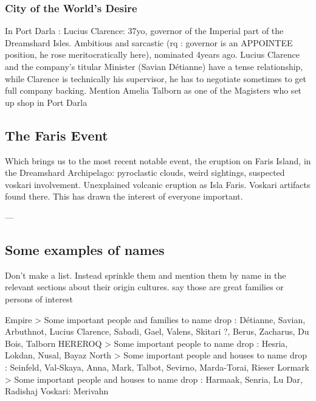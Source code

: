 \subsubsection{City of the World's Desire}

In Port Darla : Lucius Clarence: 37yo, governor of the Imperial part of the Dreamshard Isles. Ambitious and sarcastic (rq : governor is an APPOINTEE position, he rose meritocratically here), nominated 4years ago. Lucius Clarence and the company's titular Minister (Savian Détianne) have a tense relationship, while Clarence is technically his supervisor, he has to negotiate sometimes to get full company backing. Mention Amelia Talborn as one of the Magisters who set up shop in Port Darla

\subsection{The Faris Event}

Which brings us to the most recent notable event, the eruption on Faris Island, in the Dreamshard Archipelago: pyroclastic clouds, weird sightings, suspected voskari involvement. Unexplained volcanic eruption as Isla Faris. Voskari artifacts found there. This has drawn the interest of everyone important.








---




\subsection{Some examples of names}

Don't make a list. Instead sprinkle them and mention them by name in the relevant sections about their origin cultures. say those are great families or persons of interest



Empire > Some important people and families to name drop : Détianne, Savian, Arbuthnot, Lucius Clarence, Sabadi, Gael, Valens, Skitari ?, Berus, Zacharus, Du Bois, Talborn
HEREROQ > Some important people to name drop : Hesria, Lokdan, Nusal, Bayaz
North > Some important people and houses to name drop : Seinfeld, Val-Skaya, Anna, Mark, Talbot, Sevirno, Marda-Torai, Rieser
Lormark > Some important people and houses to name drop : Harmaak, Senria, Lu Dar, Radishaj
Voskari: Merivahn

